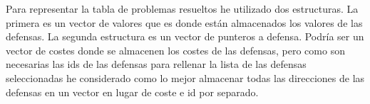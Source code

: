 Para representar la tabla de problemas resueltos he utilizado dos estructuras. 
\newline
La primera es un vector de valores que es donde están almacenados los valores de las defensas.
\newline
La segunda estructura es un vector de punteros a defensa. Podría ser un vector de costes donde se almacenen los costes de las defensas, pero
como son necesarias las ids de las defensas para rellenar la lista de las defensas seleccionadas he considerado como lo mejor almacenar todas
las direcciones de las defensas en un vector en lugar de coste e id por separado.
